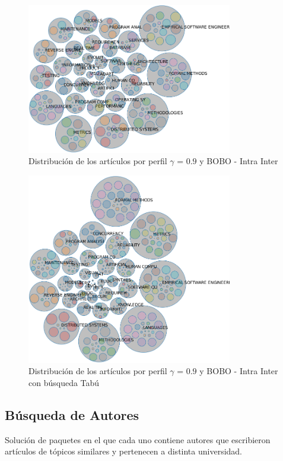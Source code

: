 \begin{figure}[H]
  \centering
    \includegraphics[width=0.8\textwidth]{resultados/papers/BOBO/INTRA_INTER/bubbles-gamma-09.png}
  \caption{Distribución de los artículos por perfil $\gamma$ = $0.9$ y BOBO - Intra Inter}
  \label{res:img-papers-bubbles-gamma09-bobo-intra-inter}
\end{figure}

\begin{figure}[H]
  \centering
    \includegraphics[width=0.8\textwidth]{resultados/papers/BOBO/INTRA_INTER/bubbles-gamma-with-local-09.png}
  \caption{Distribución de los artículos por perfil $\gamma$ = $0.9$ y BOBO - Intra Inter con búsqueda Tabú}
  \label{res:img-papers-bubbles-gamma09-hac-intra-inter-bobo}
\end{figure}
\newpage
\subsection{Búsqueda de Autores}
Solución de paquetes en el que cada uno contiene autores que escribieron artículos de tópicos similares y pertenecen a distinta universidad.

